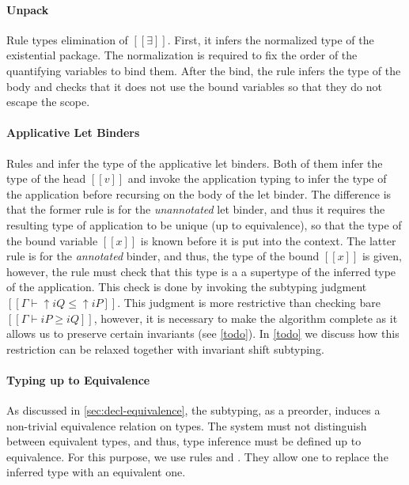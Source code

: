 \paragraph{Unpack}
  Rule  types elimination of $[[∃]]$.
  First, it infers the normalized type of the existential package.
  The normalization is required to fix the order of the quantifying variables
  to bind them. After the bind, the rule infers the type of the body 
  and checks that it does not use the bound variables so that they do not 
  escape the scope.

\paragraph{Applicative Let Binders}
  Rules  and 
  infer the type of the applicative let binders.
  Both of them infer the type of the head $[[v]]$ 
  and invoke the application typing to infer the type of the application 
  before recursing on the body of the let binder.
  The difference is that the former rule is for the 
  \emph{unannotated} let binder, and thus
  it requires the resulting type of application to be unique
  (up to equivalence), so that the type of the bound variable $[[x]]$
  is known before it is put into the context.
  The latter rule is for the \emph{annotated} binder,
  and thus, the type of the bound $[[x]]$ is given, 
  however, the rule must check that this type is a
  a supertype of the inferred type of the application. 
  This check is done by invoking the subtyping judgment
  $[[Γ ⊢ ↑iQ ≤ ↑iP]]$.
  This judgment is more restrictive than checking bare 
  $[[Γ ⊢ iP ≥ iQ]]$, however, it is necessary
  to make the algorithm complete as it allows us to preserve
  certain invariants (see \cref{todo}).
  In \cref{todo} we discuss how this restriction can be relaxed
  together with invariant shift subtyping.

\paragraph{Typing up to Equivalence}
  As discussed in \cref{sec:decl-equivalence}, the subtyping, as a preorder, 
  induces a non-trivial equivalence relation on types. 
  The system must not distinguish between equivalent types,
  and thus, type inference must be defined up to equivalence. 
  For this purpose, we use rules   
  and .
  They allow one to replace the inferred type with an equivalent one.  

